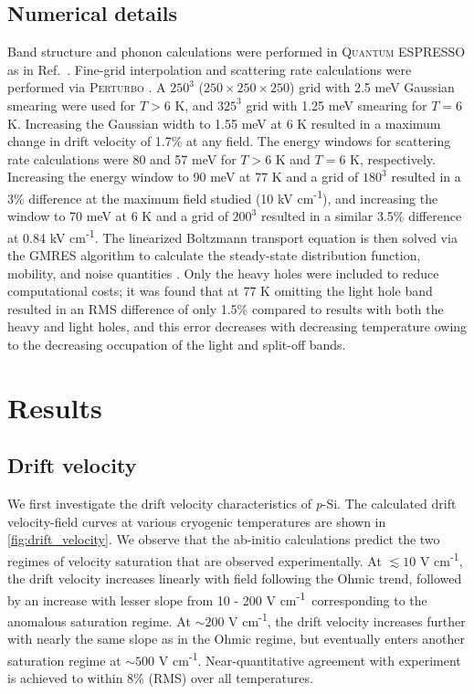 \documentclass[aps,prx,preprint,letterpaper,groupedaddress,longbibliography]{revtex4-2}
\theoremstyle{definition}
\newcommand{\eunits}{kV cm\textsuperscript{-1}}
\newcommand{\smalleunits}{V cm\textsuperscript{-1}}
\begin{document}
\subsection{Numerical details}

Band structure and phonon calculations were performed in Q\textsc{uantum} ESPRESSO \cite{Giannozzi:2009} as in Ref.~\cite{Catherall:2022}. Fine-grid interpolation and scattering rate calculations were performed via P\textsc{erturbo} \cite{Zhou:2021}. A $250^3$ ($250 \times 250 \times 250$) grid with 2.5 meV Gaussian smearing were used for $T>6$ K, and $325^3$ grid with 1.25 meV smearing for $T=6$ K. Increasing the Gaussian width to 1.55 meV at 6 K resulted in a maximum change in drift velocity of 1.7\% at any field. The energy windows for scattering rate calculations were 80 and 57 meV for $T>6$ K and $T = 6$ K, respectively. Increasing the energy window to 90 meV at 77 K and a grid of $180^3$ resulted in a 3\% difference at the maximum field studied (10 \eunits), and increasing the window to 70 meV at 6 K and a grid of $200^3$ resulted in a similar 3.5\% difference at 0.84 \eunits. The linearized Boltzmann transport equation \cite{Choi:2021} is then solved via the GMRES algorithm \cite{Scipy} to calculate the steady-state distribution function, mobility, and noise quantities \cite{Choi:2021,Catherall:2022}. Only the heavy holes were included to reduce computational costs; it was found that at 77 K omitting the light hole band resulted in an RMS difference of only 1.5\% compared to results with both the heavy and light holes, and this error decreases with decreasing temperature owing to the decreasing occupation of the light and split-off bands.

\section{Results}

\subsection{Drift velocity}

We first investigate the drift velocity characteristics of \textit{p}-Si. The calculated drift velocity-field curves at various cryogenic temperatures are shown in \cref{fig:drift_velocity}. We observe that the ab-initio calculations predict the two regimes of velocity saturation that are observed experimentally. At $\lesssim 10$ \smalleunits, the drift velocity increases linearly with field following the Ohmic trend, followed by an increase with lesser slope from 10 - 200 \smalleunits~corresponding to the anomalous saturation regime. At $\sim 200$ \smalleunits, the drift velocity increases further with nearly the same slope as in the Ohmic regime, but eventually enters another saturation regime at $\sim 500$ \smalleunits. Near-quantitative agreement with experiment is achieved to within 8\% (RMS) over all temperatures.\par
\end{document}

